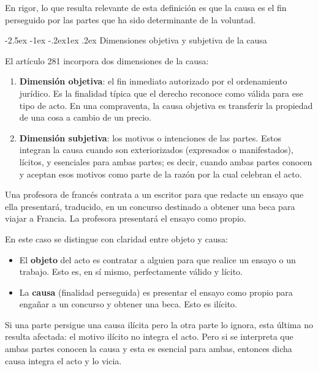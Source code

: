 \documentclass[12pt,oneside]{book}
\makeatletter
\renewcommand\subsection{\@startsection{subsection}{2}{\z@}%
  {-2.5ex \@plus -1ex \@minus -.2ex}{1ex \@plus .2ex}%
  {\normalfont\normalsize\bfseries}}
\makeatother
\begin{document}
En rigor, lo que resulta relevante de esta definición es que la causa es el fin perseguido por las partes que ha sido determinante de la voluntad.

\subsection{Dimensiones objetiva y subjetiva de la causa}

El artículo 281 incorpora dos dimensiones de la causa:

\begin{enumerate}
    \item \textbf{Dimensión objetiva}: el fin inmediato autorizado por el ordenamiento jurídico. Es la finalidad típica que el derecho reconoce como válida para ese tipo de acto. En una compraventa, la causa objetiva es transferir la propiedad de una cosa a cambio de un precio.
    \item \textbf{Dimensión subjetiva}: los motivos o intenciones de las partes. Estos integran la causa cuando son exteriorizados (expresados o manifestados), lícitos, y esenciales para ambas partes; es decir, cuando ambas partes conocen y aceptan esos motivos como parte de la razón por la cual celebran el acto.
\end{enumerate}

\begin{ejemplo}
Una profesora de francés contrata a un escritor para que redacte un ensayo que ella presentará, traducido, en un concurso destinado a obtener una beca para viajar a Francia. La profesora presentará el ensayo como propio.

En este caso se distingue con claridad entre objeto y causa:
\begin{itemize}
    \item El \textbf{objeto} del acto es contratar a alguien para que realice un ensayo o un trabajo. Esto es, en sí mismo, perfectamente válido y lícito.
    \item La \textbf{causa} (finalidad perseguida) es presentar el ensayo como propio para engañar a un concurso y obtener una beca. Esto es ilícito.
\end{itemize}

Si una parte persigue una causa ilícita pero la otra parte lo ignora, esta última no resulta afectada: el motivo ilícito no integra el acto. Pero si se interpreta que ambas partes conocen la causa y esta es esencial para ambas, entonces dicha causa integra el acto y lo vicia.
\end{ejemplo}
\end{document}
